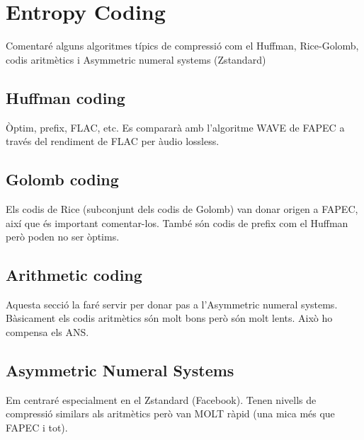 \chapter{Entropy Coding}
Comentaré alguns algoritmes típics de compressió com el Huffman, Rice-Golomb, codis aritmètics i Asymmetric numeral systems (Zstandard)


\section{Huffman coding}
Òptim, prefix, FLAC, etc. Es compararà amb l'algoritme WAVE de FAPEC a través del rendiment de FLAC per àudio lossless.

\section{Golomb coding}
Els codis de Rice (subconjunt dels codis de Golomb) van donar origen a FAPEC, així que és important comentar-los.
També són codis de prefix com el Huffman però poden no ser òptims.

\section{Arithmetic coding}
Aquesta secció la faré servir per donar pas a l'Asymmetric numeral systems. Bàsicament els codis aritmètics són molt bons però són molt lents. Això ho compensa els ANS.

\section{Asymmetric Numeral Systems}
Em centraré especialment en el Zstandard (Facebook). Tenen nivells de compressió similars als aritmètics però van MOLT ràpid (una mica més que FAPEC i tot).